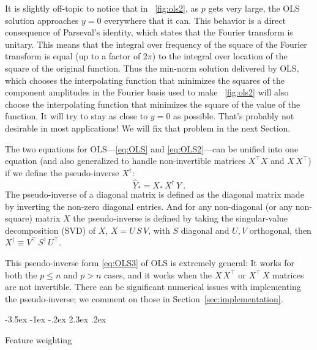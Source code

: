 \documentclass[12pt,letterpaper]{article}
\makeatletter
\renewcommand\section{\@startsection {section}{1}{\z@}%
  {-3.5ex \@plus -1ex \@minus -.2ex}%
  {2.3ex \@plus.2ex}%
  {\raggedright\normalfont\Large\bfseries}}
\newcommand{\sectionname}{Section}
\makeatother
\begin{document}
It is slightly off-topic to notice that in \figurename~\ref{fig:ols2}, as $p$ gets very large, the OLS solution approaches $y=0$ everywhere that it can.
This behavior is a direct consequence of Parseval's identity, which states that the Fourier transform is unitary.
This means that the integral over frequency of the square of the Fourier transform is equal (up to a factor of $2\pi$) to the integral over location of the square of the original function.
Thus the min-norm solution delivered by OLS, which chooses the interpolating function that minimizes the squares of the component amplitudes in the Fourier basis used to make \figurename~\ref{fig:ols2} will also choose the interpolating function that minimizes the square of the value of the function.
It will try to stay as close to $y=0$ as possible.
That's probably not desirable in most applications! We will fix that problem in the next \sectionname.

The two equations for OLS---\eqref{eq:OLS} and \eqref{eq:OLS2}---can be unified into one equation (and also generalized to handle non-invertible matrices $X^\top X$ and $X\,X^\top$) if we define the pseudo-inverse $X^\dagger$:
\begin{equation}\label{eq:OLS3}
    \hat{Y}_\ast = X_\ast\,X^\dagger\,Y
    ~.
\end{equation}
The pseudo-inverse of a diagonal matrix is defined as the diagonal matrix made by inverting the non-zero diagonal entries. And for any non-diagonal (or any non-square) matrix $X$ the pseudo-inverse is defined by taking the singular-value decomposition (SVD) of $X$, $X=U\,S\,V$, with $S$ diagonal and $U,V$ orthogonal, then $X^\dagger \equiv V^\top\,S^\dagger\,U^\top$.

This pseudo-inverse form \eqref{eq:OLS3} of OLS is extremely general: It works for both the $p\le n$ and $p>n$ cases, and it works when the $X\,X^\top$ or $X^\top\,X$ matrices are not invertible.
There can be significant numerical issues with implementing the pseudo-inverse; we comment on those in \sectionname~\ref{sec:implementation}.

\section{Feature weighting}\label{sec:fwols}
\end{document}
